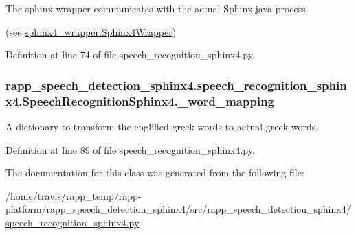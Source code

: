 The sphinx wrapper communicates with the actual Sphinx.\-java process. 

(see \hyperlink{classrapp__speech__detection__sphinx4_1_1sphinx4__wrapper_1_1Sphinx4Wrapper}{sphinx4\-\_\-wrapper.\-Sphinx4\-Wrapper}) 

Definition at line 74 of file speech\-\_\-recognition\-\_\-sphinx4.\-py.

\hypertarget{classrapp__speech__detection__sphinx4_1_1speech__recognition__sphinx4_1_1SpeechRecognitionSphinx4_a752dac4e406d54c3f27db026dca60334}{
\subsubsection[{\-\_\-word\-\_\-mapping}]{\setlength{\rightskip}{0pt plus 5cm}rapp\-\_\-speech\-\_\-detection\-\_\-sphinx4.\-speech\-\_\-recognition\-\_\-sphinx4.\-Speech\-Recognition\-Sphinx4.\-\_\-word\-\_\-mapping\hspace{0.3cm}{\ttfamily [private]}}}\label{classrapp__speech__detection__sphinx4_1_1speech__recognition__sphinx4_1_1SpeechRecognitionSphinx4_a752dac4e406d54c3f27db026dca60334}


A dictionary to transform the englified greek words to actual greek words. 



Definition at line 89 of file speech\-\_\-recognition\-\_\-sphinx4.\-py.



The documentation for this class was generated from the following file\-:\begin{DoxyCompactItemize}
\item 
/home/travis/rapp\-\_\-temp/rapp-\/platform/rapp\-\_\-speech\-\_\-detection\-\_\-sphinx4/src/rapp\-\_\-speech\-\_\-detection\-\_\-sphinx4/\hyperlink{speech__recognition__sphinx4_8py}{speech\-\_\-recognition\-\_\-sphinx4.\-py}\end{DoxyCompactItemize}

